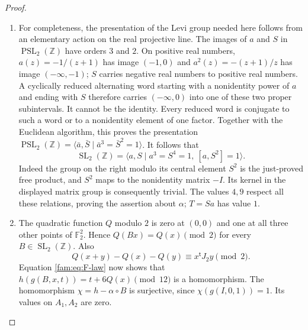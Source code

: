 \begin{proof}
\begin{enumerate}[label=\arabic*.,leftmargin=*]
\item For completeness, the presentation of the Levi group needed here follows
from an elementary action on the real projective line.  The images of $a$
and $S$ in $\operatorname{PSL}_2(\mathbb Z)$ have orders $3$ and $2$.
On positive real numbers, $a(z)=-1/(z+1)$ has image $(-1,0)$ and
$a^2(z)=-(z+1)/z$ has image $(-\infty,-1)$; $S$ carries negative real
numbers to positive real numbers.  A cyclically reduced alternating word
starting with a nonidentity power of $a$ and ending with $S$ therefore
carries $(-\infty,0)$ into one of these two proper subintervals.  It cannot
be the identity.  Every reduced word is conjugate to such a word or to a
nonidentity element of one factor.  Together with the Euclidean algorithm,
this proves the presentation
$\operatorname{PSL}_2(\mathbb Z)=\langle\bar a,\bar S\mid
\bar a^3=\bar S^2=1\rangle$.  It follows that
\begin{equation}\label{fam:eq:F-SLpresentation}
 \operatorname{SL}_2(\mathbb Z)=
 \langle a,S\mid a^3=S^4=1,\ [a,S^2]=1\rangle.
\end{equation}
Indeed the group on the right modulo its central element $S^2$ is the
just-proved free product, and $S^2$ maps to the nonidentity matrix $-I$.
Its kernel in the displayed matrix group is consequently trivial.
The values $4,9$ respect all these relations, proving the assertion about
$\alpha$; $T=Sa$ has value $1$.

\item The quadratic function $Q$ modulo $2$ is zero at $(0,0)$ and one at all
three other points of $\mathbb F_2^2$.  Hence $Q(Bx)=Q(x)\pmod2$ for every
$B\in\operatorname{SL}_2(\mathbb Z)$.  Also
\[
 Q(x+y)-Q(x)-Q(y)\equiv x^{\mathsf t}J_2y\pmod2.
\]
Equation \eqref{fam:eq:F-law} now shows that
$h(g(B,x,t))=t+6Q(x)\pmod{12}$ is a homomorphism.
The homomorphism $\chi=h-\alpha\circ B$ is surjective, since
$\chi(g(I,0,1))=1$.  Its values on $A_1,A_2$ are zero.


\end{enumerate}
\end{proof}
